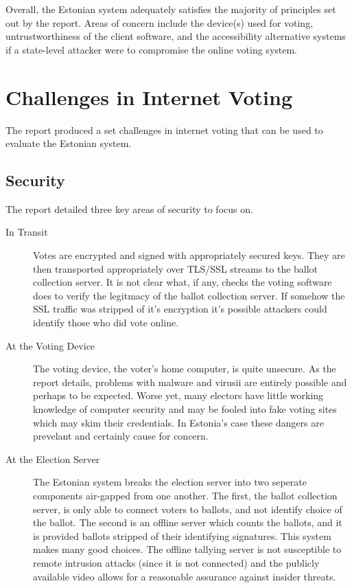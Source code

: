 \documentclass[a4paper, 11pt]{article} %
\begin{document}
Overall, the Estonian system adequately satisfies the majority of principles set out by the report. Areas of concern include the device(s) used for voting, untrustworthiness of the client software, and the accessibility alternative systems if a state-level attacker were to compromise the online voting system.


\section*{Challenges in Internet Voting}

The report produced a set challenges in internet voting that can be used to evaluate the Estonian system.

\subsection*{Security}

The report detailed three key areas of security to focus on.

\begin{description}
    \item[In Transit] Votes are encrypted and signed with appropriately secured keys. They are then transported appropriately over TLS/SSL streams to the ballot collection server. It is not clear what, if any, checks the voting software does to verify the legitmacy of the ballot collection server. If somehow the SSL traffic was stripped of it's encryption it's possible attackers could identify those who did vote online.
    \item[At the Voting Device] The voting device, the voter's home computer, is quite unsecure. As the report details, problems with malware and virusii are entirely possible and perhaps to be expected. Worse yet, many electors have little working knowledge of computer security and may be fooled into fake voting sites which may skim their credentials. In Estonia's case these dangers are prevelant and certainly cause for concern.
    \item[At the Election Server] The Estonian system breaks the election server into two seperate components air-gapped from one another. The first, the ballot collection server, is only able to connect voters to ballots, and not identify choice of the ballot. The second is an offline server which counts the ballots, and it is provided ballots stripped of their identifying signatures. This system makes many good choices. The offline tallying server is not susceptible to remote intrusion attacks (since it is not connected) and the publicly available video allows for a reasonable assurance against insider threats.
\end{description}
\end{document}
